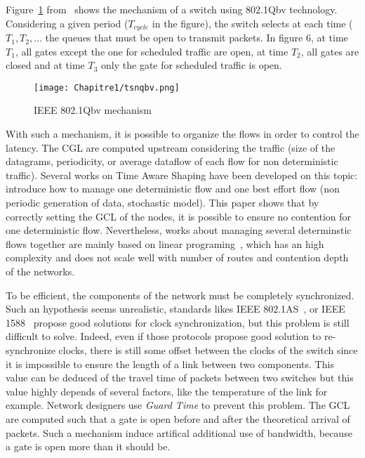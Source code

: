 Figure~\ref{fig:tsnqbv} from~\cite{durr2016no} shows the mechanism of a switch using 802.1Qbv technology. Considering a given period ($T_{cycle}$ in the figure), the switch selects at each time ($T_1 , T_2 , \ldots$ the queues that must be open to transmit packets. In figure 6, at time $T_1$, all gates except the one for scheduled traffic are open, at time $T_2$, all gates are closed and at time $T_3$ only the gate for scheduled traffic is open.

  \begin{figure}
  \begin{center}
  \texttt{[image: Chapitre1/tsnqbv.png]}
  \end{center}
  \caption{IEEE 802.1Qbv mechanism}\label{fig:tsnqbv}
  \end{figure}
      
With such a mechanism, it is possible to organize the flows in order to control the latency. The CGL are computed upstream considering the traffic (size of the datagrams, periodicity, or average dataflow of each flow for non deterministic traffic). Several works on Time Aware Shaping have been developed on this topic: \cite{al2017modeling} introduce how to manage one deterministic flow and one best effort flow (non periodic generation of data, stochastic model). This paper shows that by correctly setting the GCL of the nodes, it is possible to ensure no contention for one deterministic flow. Nevertheless, works about managing several determinstic flows together are mainly based on linear programing~\cite{steiner2018traffic,silviu2017,nayak2017incremental,naresh2016}, which has an high complexity and does not scale well with number of routes and contention depth of the networks.


To be efficient, the components of the network must be completely synchronized. Such an hypothesis seems unrealistic, standards likes IEEE 802.1AS~\cite{5741898}, or IEEE 1588~\cite{4579760} propose good solutions for clock synchronization, but this problem is still difficult to solve. Indeed, even if those protocols propose good solution to re-synchronize clocks, there is still some offset between the clocks of the switch since it is impossible to ensure the length of a link between two components. This value can be deduced of the travel time of packets between two switches but this value highly depends of several factors, like the temperature of the link for example. Network designers use {\em Guard Time} to prevent this problem. The GCL are computed such that a gate is open before and after the theoretical arrival of packets. Such a mechanism induce artifical additional use of bandwidth, because a gate is open more than it should be.

